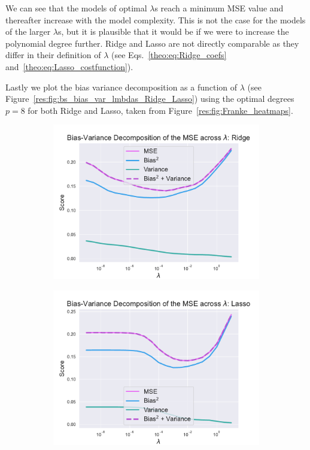 \documentclass[twocolumn,english,notitlepage]{article}
\begin{document}
            We can see that the models of optimal $\lambda$s reach a minimum MSE value and thereafter increase with the model complexity. This is not the case for the models of the larger $\lambda$s, but it is plausible that it would be if we were to increase the polynomial degree further. Ridge and Lasso are not directly comparable as they differ in their definition of $\lambda$ (see Eqs.~\eqref{theo:eq:Ridge_coefs} and~\eqref{theo:eq:Lasso_costfunction}).   
            
            Lastly we plot the bias variance decomposition as a function of $\lambda$ (see Figure~\ref{res:fig:bs_bias_var_lmbdas_Ridge_Lasso}) using the optimal degrees $p=8$ for both Ridge and Lasso, taken from Figure~\ref{res:fig:Franke_heatmaps}.  

            \begin{figure}[ht]
                \begin{subfigure}{\linewidth}
                    \centering
                    \includegraphics[width=\linewidth]{BS_bias_var_lmbdas_Ridge.pdf}
                \end{subfigure}
                \begin{subfigure}{\linewidth}
                    \centering
                    \includegraphics[width=\linewidth]{BS_bias_var_lmbdas_Lasso.pdf}

\end{subfigure}
\end{figure}
\end{document}
